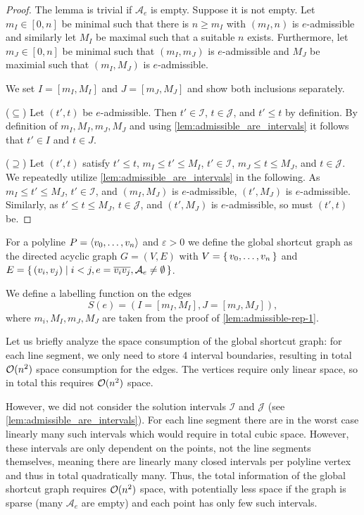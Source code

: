 \begin{proof}
	The lemma is trivial if \(\mathcal{A}_e\) is empty. Suppose it is not empty. 
	Let \(m_I \in [0, n]\) be minimal such that there is \(n \geq m_I\) with \((m_I, n)\) is \(e\)-admissible and similarly let \(M_I\) be maximal such that a suitable \(n\) exists. Furthermore, let \(m_J \in [0,n]\) be minimal such that \((m_I, m_J)\) is \(e\)-admissible and \(M_J\) be maximial such that \((m_I, M_J)\) is \(e\)-admissible. 

	We set \(I = [m_I, M_I]\) and \(J = [m_J, M_J]\) and show both inclusions separately.

	(\(\subseteq\)) Let \((t', t)\) be \(e\)-admissible. Then \(t' \in \mathcal{I}\), \(t \in \mathcal{J}\), and \(t' \leq t\) by definition. By definition of \(m_I, M_I, m_J, M_J\) and using \cref{lem:admissible_are_intervals} it follows that \(t' \in I\) and \(t \in J\).

	(\(\supseteq\)) Let \((t', t)\) satisfy \(t' \leq t\), \(m_I \leq t' \leq M_I\), \(t' \in \mathcal{I}\), \(m_J \leq t \leq M_J\), and \(t \in \mathcal{J}\). We repeatedly utilize \cref{lem:admissible_are_intervals} in the following. As \(m_I \leq t' \leq M_J\), \(t' \in \mathcal{I}\), and \((m_I, M_J)\) is \(e\)-admissible, \((t', M_J)\) is \(e\)-admissible. Similarly, as \(t' \leq t \leq M_J\), \(t \in \mathcal{J}\), and \((t', M_J)\) is \(e\)-admissible, so must \((t', t)\) be.
\end{proof}


\begin{definition}
	For a polyline \(P = \left\langle v_0, \dots, v_n\right\rangle\) and \(\varepsilon > 0\) we define the global shortcut graph as the directed acyclic graph \(G = (V, E)\) with \(V = \set{v_0, \dots, v_n}\) and \(E = \set{(v_i, v_j) \mid i < j, e = \overline{v_iv_j}, \mathcal{A}_e \neq \emptyset}\).

	We define a labelling function on the edges 
	\[S(e) = (I = [m_I, M_I], J = [m_J, M_J]),\]
	where \(m_i, M_I, m_J, M_J\) are taken from the proof of \cref{lem:admissible-rep-1}.
\end{definition}

Let us briefly analyze the space consumption of the global shortcut graph: for each line segment, we only need to store 4 interval boundaries, resulting in total \(\mathcal{O}(n^2)\) space consumption for the edges. The vertices require only linear space, so in total this requires \(\mathcal{O}(n^2)\) space. 

However, we did not consider the solution intervals \(\mathcal{I}\) and \(\mathcal{J}\) (see \cref{lem:admissible_are_intervals}). For each line segment there are in the worst case linearly many such intervals which would require in total cubic space. However, these intervals are only dependent on the points, not the line segments themselves, meaning there are linearly many closed intervals per polyline vertex and thus in total quadratically many. Thus, the total information of the global shortcut graph requires \(\mathcal{O}(n^2)\) space, with potentially less space if the graph is sparse (many \(\mathcal{A}_e\) are empty) and each point has only few such intervals. 






